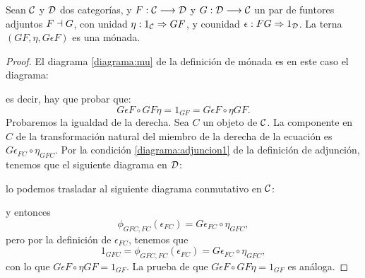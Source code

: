 \begin{theorem}
Sean $\mathcal{C}$ y $\mathcal{D}$ dos categorías, y $F : \mathcal{C}\longrightarrow \mathcal{D}$ y $G: \mathcal{D}\longrightarrow \mathcal{C}$ un
par de funtores adjuntos $F \dashv G$, con unidad
$\eta : 1_{\mathcal{C}}\Rightarrow GF$, y counidad $\epsilon: FG\Rightarrow 1_{\mathcal{D}}$. La terna
$(GF, \eta, G\epsilon F)$ es una mónada.
\end{theorem}
\begin{proof}
  El diagrama \eqref{diagrama:mu} de la definición de mónada es en este
  caso el diagrama:
  \begin{center}
  \end{center}
  es decir, hay que probar que:
  $$G\epsilon F \circ GF\eta = 1_{GF} = G\epsilon F \circ \eta GF.$$
  Probaremos la igualdad de la derecha.
  Sea $C$ un objeto de $\mathcal{C}$. La componente en
  $C$ de la transformación natural del
  miembro de la derecha de la ecuación
  es $G\epsilon_{FC} \circ \eta_{GFC}$.
  Por la condición \eqref{diagrama:adjuncion1} de la definición de
  adjunción, tenemos que el siguiente diagrama en $\mathcal{D}$:
  \begin{center}
  \end{center}
  lo podemos trasladar al siguiente diagrama conmutativo en $\mathcal{C}$:
  \begin{center}
  \end{center}
  y entonces $$\phi_{GFC, FC}(\epsilon_{FC}) = G\epsilon_{FC} \circ \eta_{GFC},$$
  pero por la definición de $\epsilon_{FC}$, tenemos que
  $$1_{GFC} = \phi_{GFC, FC}(\epsilon_{FC}) = G\epsilon_{FC} \circ \eta_{GFC},$$
  con lo que
  $G\epsilon F \circ \eta GF = 1_{GF}$. La prueba de que $G\epsilon F \circ GF\eta = 1_{GF}$ es análoga.



\end{proof}
